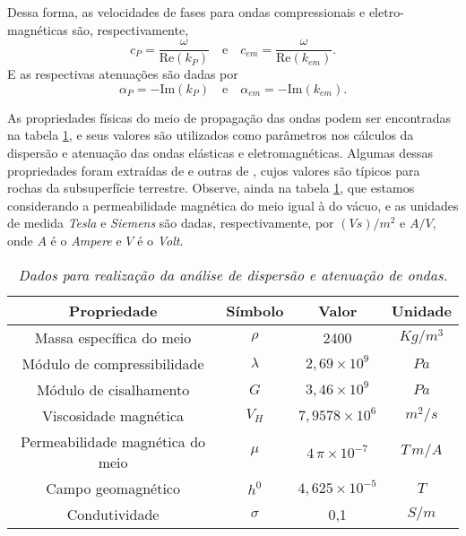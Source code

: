 Dessa forma, as velocidades de fases para ondas compressionais e eletro-magn\'eticas s\~ao, respectivamente,
\begin{equation*}
c_{P}=\frac{\omega}{\text{Re}(k_{P})}\quad\text{e}\quad c_{em}=\frac{\omega}{\text{Re}(k_{em})}.
\end{equation*}
E as respectivas atenua\c{c}\~oes s\~ao dadas por
\begin{equation*}
\alpha_{P}=-\text{Im}(k_{P})\quad\text{e}\quad \alpha_{em}=-\text{Im}(k_{em}).
\end{equation*}

As propriedades f\'isicas do meio de propaga\c{c}\~ao das ondas podem ser encontradas na tabela \ref{tab.dados_dispersao}, e seus valores s\~ao utilizados como par\^ametros nos c\'alculos da dispers\~ao e atenua\c{c}\~ao das ondas el\'asticas e eletromagn\'eticas. Algumas dessas propriedades foram extra\'idas de \cite{White_Zhou_2006} e outras de \cite{griffiths}, cujos valores s\~ao t\'ipicos para rochas da subsuperf\'icie terrestre. Observe, ainda na tabela \ref{tab.dados_dispersao}, que estamos considerando a permeabilidade magn\'etica do meio igual \`a do v\'acuo, e as unidades de medida \textit{Tesla} e \textit{Siemens} s\~ao dadas, respectivamente, por $(Vs)/m^2$ e $A/V$, onde $A$ \'e o \textit{Ampere} e $V$ \'e o \textit{Volt}.

\begin{table}
\begin{center}
\begin{tabular}{|c|c|c|c|}
\hline 
Propriedade & S\'imbolo & Valor & Unidade \\ 
\hline 
Massa espec\'ifica do meio & $\rho$ & 2400 & $Kg/m^3$ \\ 
\hline 
M\'odulo de compressibilidade & $\lambda$ & $2,69\times 10^9$ & $Pa$ \\ 
\hline 
M\'odulo de cisalhamento & $G$ & $3,46\times 10^9$ & $Pa$ \\ 
\hline 
Viscosidade magn\'etica & $V_H$ & $7,9578\times 10^{6}$ & $m^2/s$ \\ 
\hline 
Permeabilidade magn\'etica do meio & $\mu$ & $4\,\pi\times 10^{-7}$ & $T\,m/A$ \\ 
\hline 
Campo geomagn\'etico & $h^0$ & $4,625\times 10^{-5}$ & $T$ \\ 
\hline 
Condutividade & $\sigma$ & 0,1 & $S/m$ \\
\hline
\end{tabular}
\end{center}
\caption{\textit{Dados para realiza\c{c}\~ao da an\'alise de dispers\~ao e atenua\c{c}\~ao de ondas.}}
\label{tab.dados_dispersao}
\end{table}

